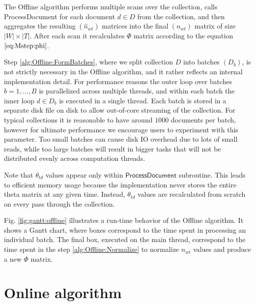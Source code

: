 \documentclass[russian,english]{llncs}
\newcommand{\kw}[1]{\textsf{#1}}
\begin{document}
The \kw{Offline algorithm} performs multiple scans over the collection, calls \kw{ProcessDocument}
for each document $d \in D$ from the collection,
and then aggregates the resulting $(\hat n_{wt})$ matrices into the final $(n_{wt})$ matrix of size $|W| \times |T|$.
After each scan it recalculates $\Phi$ matrix according to the equation $\eqref{eq:Mstep:phi}$.

Step \ref{alg:Offline:FormBatches}, where we split collection $D$ into batches $(D_b)$, is not strictly necessary in the \kw{Offline algorithm},
and it rather reflects an internal implementation detail.
For performance reasons the outer loop over batches $b = 1, \dots, B$ is parallelized across multiple threads,
and within each batch the inner loop $d \in D_b$ is executed in a single thread.
Each batch is stored in a separate disk file on disk to allow out-of-core streaming of the collection.
For typical collections it is reasonable to have around $1000$ documents per batch,
however for ultimate performance we encourage users to experiment with this parameter.
Too small batches can cause disk IO overhead due to lots of small reads,
while too large batches will result in bigger tasks that will not be distributed evenly across computation threads.

Note that $\theta_{td}$ values appear only within $\kw{ProcessDocument}$ subroutine.
This leads to efficient memory usage because the implementation never stores the entire theta matrix at any given time.
Instead, $\theta_{td}$ values are recalculated from scratch on every pass through the collection.

Fig. \ref{fig:gantt:offline} illustrates a run-time behavior of the \kw{Offline algorithm}.
It shows a Gantt chart, where boxes correspond to the time spent in processing an individual batch.
The final box, executed on the main thread, correspond to the time spent in the step \ref{alg:Offline:Normalize}
to normalize $n_{wt}$ values and produce a new $\Phi$ matrix.

\section{Online algorithm}
\label{sec:Online}
\end{document}
